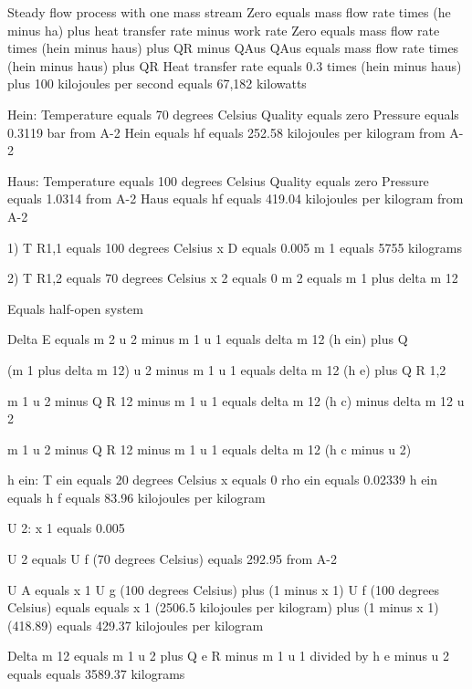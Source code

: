 Steady flow process with one mass stream
Zero equals mass flow rate times (he minus ha) plus heat transfer rate minus work rate
Zero equals mass flow rate times (hein minus haus) plus QR minus QAus
QAus equals mass flow rate times (hein minus haus) plus QR
Heat transfer rate equals 0.3 times (hein minus haus) plus 100 kilojoules per second equals 67,182 kilowatts

Hein:
Temperature equals 70 degrees Celsius
Quality equals zero
Pressure equals 0.3119 bar from A-2
Hein equals hf equals 252.58 kilojoules per kilogram from A-2

Haus:
Temperature equals 100 degrees Celsius
Quality equals zero
Pressure equals 1.0314 from A-2
Haus equals hf equals 419.04 kilojoules per kilogram from A-2

1) T R1,1 equals 100 degrees Celsius  
x D equals 0.005  
m 1 equals 5755 kilograms  

2) T R1,2 equals 70 degrees Celsius  
x 2 equals 0  
m 2 equals m 1 plus delta m 12  

Equals half-open system  

Delta E equals m 2 u 2 minus m 1 u 1 equals delta m 12 (h ein) plus Q  

(m 1 plus delta m 12) u 2 minus m 1 u 1 equals delta m 12 (h e) plus Q R 1,2  

m 1 u 2 minus Q R 12 minus m 1 u 1 equals delta m 12 (h c) minus delta m 12 u 2  

m 1 u 2 minus Q R 12 minus m 1 u 1 equals delta m 12 (h c minus u 2)  

h ein:  
T ein equals 20 degrees Celsius  
x equals 0  
rho ein equals 0.02339  
h ein equals h f equals 83.96 kilojoules per kilogram  

U 2:  
x 1 equals 0.005  

U 2 equals U f (70 degrees Celsius) equals 292.95 from A-2  

U A equals x 1 U g (100 degrees Celsius) plus (1 minus x 1) U f (100 degrees Celsius) equals  
equals x 1 (2506.5 kilojoules per kilogram) plus (1 minus x 1) (418.89) equals 429.37 kilojoules per kilogram  

Delta m 12 equals m 1 u 2 plus Q e R minus m 1 u 1 divided by h e minus u 2 equals  
equals 3589.37 kilograms
